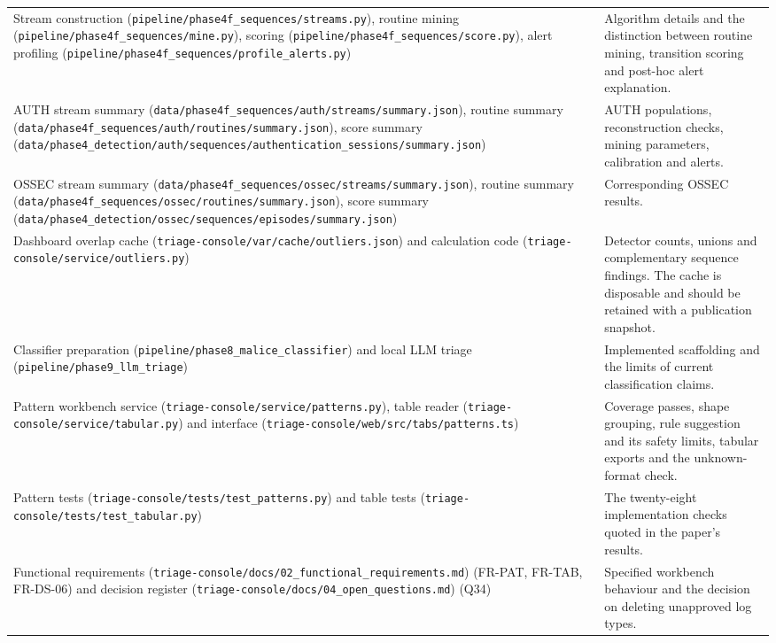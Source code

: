 \documentclass[11pt,a4paper]{article}
\newcommand{\projectref}[2]{#1 {\footnotesize(\nolinkurl{#2})}}
\begin{document}
\begin{longtable}{>{\RaggedRight\arraybackslash}p{}>{\RaggedRight\arraybackslash}p{}}
\projectref{Stream construction}{pipeline/phase4f_sequences/streams.py}, \projectref{routine mining}{pipeline/phase4f_sequences/mine.py}, \projectref{scoring}{pipeline/phase4f_sequences/score.py}, \projectref{alert profiling}{pipeline/phase4f_sequences/profile_alerts.py} & Algorithm details and the distinction between routine mining, transition scoring and post-hoc alert explanation. \\[3pt]
AUTH \projectref{stream summary}{data/phase4f_sequences/auth/streams/summary.json}, \projectref{routine summary}{data/phase4f_sequences/auth/routines/summary.json}, \projectref{score summary}{data/phase4_detection/auth/sequences/authentication_sessions/summary.json} & AUTH populations, reconstruction checks, mining parameters, calibration and alerts. \\[3pt]
OSSEC \projectref{stream summary}{data/phase4f_sequences/ossec/streams/summary.json}, \projectref{routine summary}{data/phase4f_sequences/ossec/routines/summary.json}, \projectref{score summary}{data/phase4_detection/ossec/sequences/episodes/summary.json} & Corresponding OSSEC results. \\[3pt]
\projectref{Dashboard overlap cache}{triage-console/var/cache/outliers.json} and \projectref{calculation code}{triage-console/service/outliers.py} & Detector counts, unions and complementary sequence findings. The cache is disposable and should be retained with a publication snapshot. \\[3pt]
\projectref{Classifier preparation}{pipeline/phase8_malice_classifier} and \projectref{local LLM triage}{pipeline/phase9_llm_triage} & Implemented scaffolding and the limits of current classification claims. \\[3pt]
\projectref{Pattern workbench service}{triage-console/service/patterns.py}, \projectref{table reader}{triage-console/service/tabular.py} and \projectref{interface}{triage-console/web/src/tabs/patterns.ts} & Coverage passes, shape grouping, rule suggestion and its safety limits, tabular exports and the unknown-format check. \\[3pt]
\projectref{Pattern tests}{triage-console/tests/test_patterns.py} and \projectref{table tests}{triage-console/tests/test_tabular.py} & The twenty-eight implementation checks quoted in the paper's results. \\[3pt]
\projectref{Functional requirements}{triage-console/docs/02_functional_requirements.md} (FR-PAT, FR-TAB, FR-DS-06) and \projectref{decision register}{triage-console/docs/04_open_questions.md} (Q34) & Specified workbench behaviour and the decision on deleting unapproved log types. \\[3pt]

\end{longtable}
\end{document}
